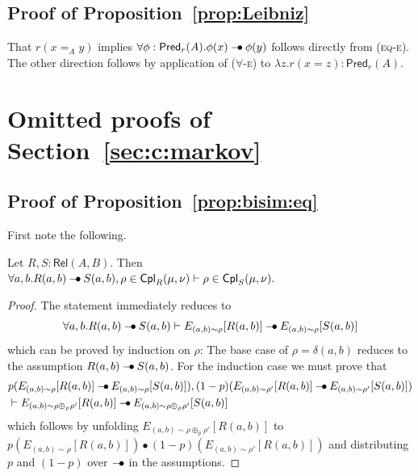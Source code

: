 \documentclass[a4paper,UKenglish,cleveref, autoref, thm-restate]{lipics-v2021}
\newcommand{\ts}{\vdash}
\newcommand{\mean}[3]{E_{#1 \sim #2}[#3]}
\newcommand{\ltensor}{*}
\renewcommand{\ltensor}{\bullet}
\newcommand{\lexp}{\mathbin{{-}\kern-.2em\raisebox{0ex}{$*$}}}
\renewcommand{\lexp}{\mathbin{{-}\kern-.2em\raisebox{0ex}{$\bullet$}}}
\newcommand{\coup}[4]{#2 \in \mathsf{Cpl}_{#1}(#3,#4)}
\newcommand{\Rel}[2]{\mathsf{Rel}(#1,#2)}
\newcommand{\PredQ}[2]{\mathsf{Pred}_{#2}(#1)}
\newcommand{\peq}{=}
\begin{document}
\subsection*{Proof of Proposition~\ref{prop:Leibniz}}
That $r(x \peq_A y)$ implies $\forall \phi : \PredQ Ar . \phi(x) \lexp \phi(y)$ follows directly from (\textsc{eq-e}). The other direction 
follows by application of (\textsc{$\forall$-e}) to $\lambda z. r(x \peq z) : \PredQ Ar$.

\section{Omitted proofs of Section~\ref{sec:c:markov}}

\subsection*{Proof of Proposition~\ref{prop:bisim:eq}}

First note the following.

\begin{lemma} \label{lem:coup:imp}
 Let $R,S : \Rel AB$. Then 
 $\forall a,b . R(a,b) \lexp S(a,b), \coup{R}\rho\mu\nu \ts \coup{S}\rho\mu\nu.$
\end{lemma}
\begin{proof}
 The statement immediately reduces to 
 \[
   \forall a,b . R(a,b) \lexp S(a,b)\ts \mean{(a,b)}{\rho}{R(a,b)} \lexp \mean{(a,b)}{\rho}{S(a,b)}
 \]
 which can be proved by induction on $\rho$: The base case of $\rho = \delta(a,b)$ reduces to the assumption 
 $R(a,b) \lexp S(a,b)$. For the induction case we must prove that 
 \begin{align*}
 & p(\mean{(a,b)}{\rho}{R(a,b)} \lexp \mean{(a,b)}{\rho}{S(a,b)}), (1-p)(\mean{(a,b)}{\rho'}{R(a,b)} \lexp \mean{(a,b)}{\rho'}{S(a,b)})
 \\ & \ts \mean{(a,b)}{\rho\oplus_p\rho'}{R(a,b)} \lexp \mean{(a,b)}{\rho\oplus_p\rho'}{S(a,b)}
\end{align*}
 which follows by unfolding $\mean{(a,b)}{\rho\oplus_p\rho'}{R(a,b)} $ to 
 $p(\mean{(a,b)}{\rho}{R(a,b)})\ltensor (1-p)(\mean{(a,b)}{\rho'}{R(a,b)})$ and distributing $p$ and $(1-p)$ over $\lexp$ in
 the assumptions. 
\end{proof}
\end{document}
